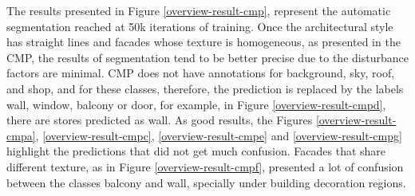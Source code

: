 The results presented in Figure \ref{overview-result-cmp}, represent the automatic segmentation reached at 50k iterations of training. Once the architectural style has straight lines and facades whose texture is homogeneous, as presented in the CMP, the results of segmentation tend to be better precise due to the disturbance factors are minimal. CMP does not have annotations for background, sky, roof, and shop, and for these classes, therefore, the prediction is replaced by the labels wall, window, balcony or door, for example, in Figure \ref{overview-result-cmpd}, there are stores predicted as wall. As good results, the Figures \ref{overview-result-cmpa}, \ref{overview-result-cmpc}, \ref{overview-result-cmpe} and \ref{overview-result-cmpg} highlight the predictions that did not get much confusion. Facades that share different texture, as in Figure \ref{overview-result-cmpf}, presented a lot of confusion between the classes balcony and wall, specially under building decoration regions.
